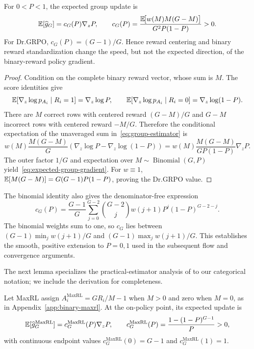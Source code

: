 \begin{lemma}
\label{lem:grpo-mean}
For $0<P<1$, the expected group update is
\begin{equation}
  \mathbb E[\widehat g_G]
  =c_G(P)\nabla_z P,
  \qquad
  c_G(P)=
  \frac{\mathbb E\!\big[w(M)M(G-M)\big]}{G^2P(1-P)}>0.
  \label{eq:expected-group-gradient}
\end{equation}
For Dr.GRPO, $c_G(P)=(G-1)/G$. Hence reward centering and binary reward
standardization change the speed, but not the expected direction, of the
binary-reward policy gradient.
\end{lemma}

\begin{proof}
Condition on the complete binary reward vector, whose sum is $M$. The score
identities give
\[
  \mathbb E[\nabla_z\log p_{A_i}\mid R_i=1]=\nabla_z\log P,
  \qquad
  \mathbb E[\nabla_z\log p_{A_i}\mid R_i=0]
  =\nabla_z\log(1-P).
\]
There are $M$ correct rows with centered reward $(G-M)/G$ and $G-M$
incorrect rows with centered reward $-M/G$. Therefore the conditional
expectation of the unaveraged sum in~\eqref{eq:group-estimator} is
\[
  w(M)\frac{M(G-M)}{G}
  \left(\nabla_z\log P-\nabla_z\log(1-P)\right)
  =w(M)\frac{M(G-M)}{GP(1-P)}\nabla_zP.
\]
The outer factor $1/G$ and expectation over
$M\sim\operatorname{Binomial}(G,P)$ yield~\eqref{eq:expected-group-gradient}.
For $w\equiv1$,
$\mathbb E[M(G-M)]=G(G-1)P(1-P)$, proving the Dr.GRPO value.
\end{proof}

The binomial identity also gives the denominator-free expression
\[
 c_G(P)=\frac{G-1}{G}\sum_{j=0}^{G-2}\binom{G-2}{j}
 w(j+1)P^j(1-P)^{G-2-j}.
\]
The binomial weights sum to one, so $c_G$ lies between
$(G-1)\min_j w(j+1)/G$ and $(G-1)\max_j w(j+1)/G$.
This establishes the smooth, positive extension to $P=0,1$ used in the
subsequent flow and convergence arguments.

The next lemma specializes the practical-estimator analysis of
\citet[Section~4.3 and Appendix~D, Theorem~5]{tajwar2026maxrl}
to our categorical notation; we include the derivation for completeness.

\begin{lemma}
\label{lem:maxrl-mean}
Let MaxRL assign
$A_i^{\mathrm{MaxRL}}=GR_i/M-1$ when $M>0$ and zero when $M=0$, as in
Appendix~\ref{app:binary-maxrl}. At the on-policy point, its expected update is
\begin{equation}
  \mathbb E[\widehat g_G^{\mathrm{MaxRL}}]
  =c_G^{\mathrm{MaxRL}}(P)\nabla_zP,
  \qquad
  c_G^{\mathrm{MaxRL}}(P)
  =\frac{1-(1-P)^{G-1}}{P}>0,
  \label{eq:maxrl-expected-gradient}
\end{equation}
with continuous endpoint values
$c_G^{\mathrm{MaxRL}}(0)=G-1$ and
$c_G^{\mathrm{MaxRL}}(1)=1$.
\end{lemma}

